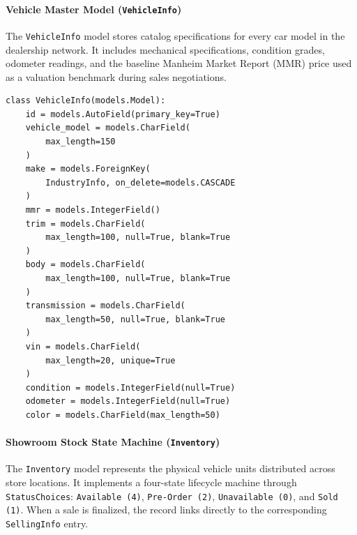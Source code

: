 \paragraph{Vehicle Master Model (\texttt{VehicleInfo})}
The \texttt{VehicleInfo} model stores catalog specifications for every car model in the dealership network. It includes mechanical specifications, condition grades, odometer readings, and the baseline Manheim Market Report (MMR) price used as a valuation benchmark during sales negotiations.

\begin{tcolorbox}[title=\textbf{Listing 5.2: Vehicle Specification Model (\texttt{VehicleInfo})}, colback=gray!4, colframe=indigo!70!black, arc=2pt, boxrule=0.6pt, left=6pt, right=6pt, top=4pt, bottom=4pt]
\footnotesize
\begin{verbatim}
class VehicleInfo(models.Model):
    id = models.AutoField(primary_key=True)
    vehicle_model = models.CharField(
        max_length=150
    )
    make = models.ForeignKey(
        IndustryInfo, on_delete=models.CASCADE
    )
    mmr = models.IntegerField()
    trim = models.CharField(
        max_length=100, null=True, blank=True
    )
    body = models.CharField(
        max_length=100, null=True, blank=True
    )
    transmission = models.CharField(
        max_length=50, null=True, blank=True
    )
    vin = models.CharField(
        max_length=20, unique=True
    )
    condition = models.IntegerField(null=True)
    odometer = models.IntegerField(null=True)
    color = models.CharField(max_length=50)
\end{verbatim}
\end{tcolorbox}

\paragraph{Showroom Stock State Machine (\texttt{Inventory})}
The \texttt{Inventory} model represents the physical vehicle units distributed across store locations. It implements a four-state lifecycle machine through \texttt{StatusChoices}: \texttt{Available (4)}, \texttt{Pre-Order (2)}, \texttt{Unavailable (0)}, and \texttt{Sold (1)}. When a sale is finalized, the record links directly to the corresponding \texttt{SellingInfo} entry.

